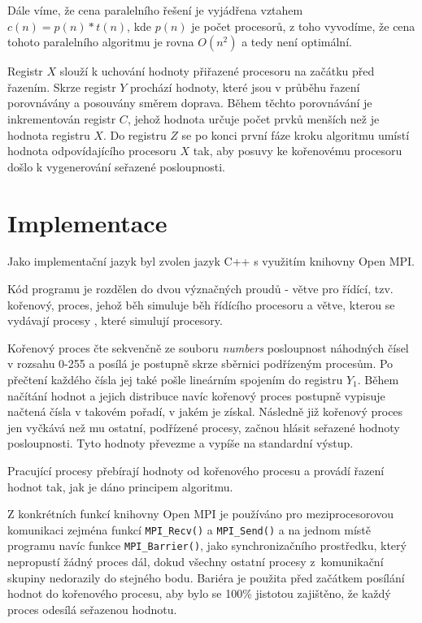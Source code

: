 \documentclass[a4paper,10pt]{article}
\newcommand{\Omicron}{O}
\begin{document}
    	\par Dále víme, že cena paralelního řešení je vyjádřena vztahem $c\left(n\right) = p\left(n\right) * t\left(n\right)$, kde $p\left(n\right)$ je počet procesorů, z toho vyvodíme, že cena tohoto paralelního algoritmu je rovna $\Omicron\left(n^2\right)$ a tedy není optimální.


    	\par Registr $X$ slouží k uchování hodnoty přiřazené procesoru na začátku před řazením. Skrze registr $Y$ prochází hodnoty, které jsou v průběhu řazení porovnávány a posouvány směrem doprava. Během těchto porovnávání je inkrementován registr $C$, jehož hodnota určuje počet prvků menších než je hodnota registru $X$. Do registru $Z$ se po konci první fáze kroku algoritmu umístí hodnota odpovídajícího procesoru $X$ tak, aby posuvy ke kořenovému procesoru došlo k vygenerování seřazené posloupnosti.

	\section{Implementace}
	\label{sec:implementace}
    	\par Jako implementační jazyk byl zvolen jazyk C++ s využitím knihovny Open MPI. 
    	\par Kód programu je rozdělen do dvou význačných proudů \-- větve pro řídící, tzv. kořenový, proces, jehož běh simuluje běh řídícího procesoru a větve, kterou se vydávají procesy , které simulují  procesory.

    	\par Kořenový proces čte sekvenčně ze souboru \textit{numbers} posloupnost náhodných čísel v rozsahu 0-255 a posílá je postupně skrze sběrnici podřízeným procesům. Po přečtení každého čísla jej také pošle lineárním spojením do registru $Y_1$. Během načítání hodnot a jejich distribuce navíc kořenový proces postupně vypisuje načtená čísla v takovém pořadí, v jakém je získal. Následně již kořenový proces jen vyčkává než mu ostatní, podřízené procesy, začnou hlásit seřazené hodnoty posloupnosti. Tyto hodnoty převezme a vypíše na standardní výstup.
    	
    	\par Pracující procesy přebírají hodnoty od kořenového procesu a provádí řazení hodnot tak, jak je dáno principem algoritmu. 
    	
    	\par Z konkrétních funkcí knihovny Open MPI je používáno pro meziprocesorovou komunikaci zejména funkcí \texttt{MPI\_Recv()} a \texttt{MPI\_Send()} a na jednom místě programu navíc funkce \texttt{MPI\_Barrier()}, jako synchronizačního prostředku, který nepropustí žádný proces dál, dokud všechny ostatní procesy z~komunikační skupiny nedorazily do stejného bodu. Bariéra je použita před začátkem posílání hodnot do kořenového procesu, aby bylo se 100\% jistotou zajištěno, že každý proces odesílá seřazenou hodnotu.
\end{document}
